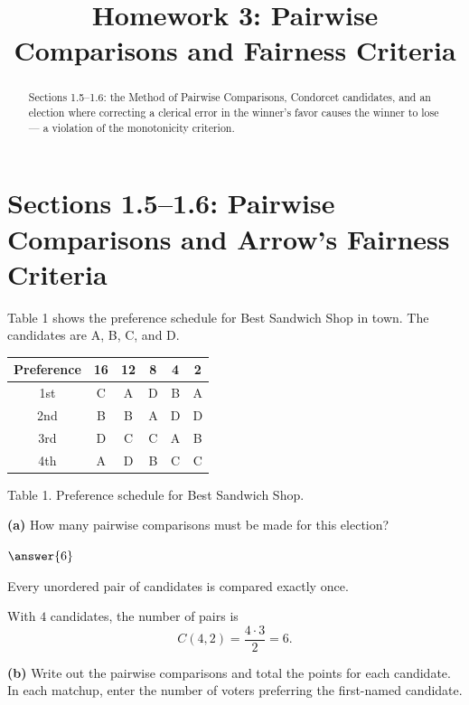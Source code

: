 \documentclass[12pt]{ximera}
\title{Homework 3: Pairwise Comparisons and Fairness Criteria}
\begin{document}
\begin{abstract}
Sections 1.5--1.6: the Method of Pairwise Comparisons, Condorcet candidates, and an
election where correcting a clerical error in the winner's favor causes the winner to
lose --- a violation of the monotonicity criterion.
\end{abstract}
\maketitle

\section*{Sections 1.5--1.6: Pairwise Comparisons and Arrow's Fairness Criteria}

\begin{problem}
Table 1 shows the preference schedule for Best Sandwich Shop in town.
The candidates are A, B, C, and D.

\begin{center}
\begin{tabular}{c|ccccc}
Preference & 16 & 12 & 8 & 4 & 2 \\\hline
1st & C & A & D & B & A \\
2nd & B & B & A & D & D \\
3rd & D & C & C & A & B \\
4th & A & D & B & C & C
\end{tabular}

\smallskip
Table 1. Preference schedule for Best Sandwich Shop.
\end{center}

\begin{prompt}
\textbf{(a)} How many pairwise comparisons must be made for this election?

$\answer{6}$

\begin{hint}
Every unordered pair of candidates is compared exactly once.
\end{hint}

\begin{feedback}
With $4$ candidates, the number of pairs is
\[ C(4,2)=\frac{4\cdot 3}{2}=6. \]
\end{feedback}
\end{prompt}

\begin{prompt}
\textbf{(b)} Write out the pairwise comparisons and total the points for each
candidate. In each matchup, enter the number of voters preferring the first-named
candidate.


\end{prompt}
\end{problem}
\end{document}
